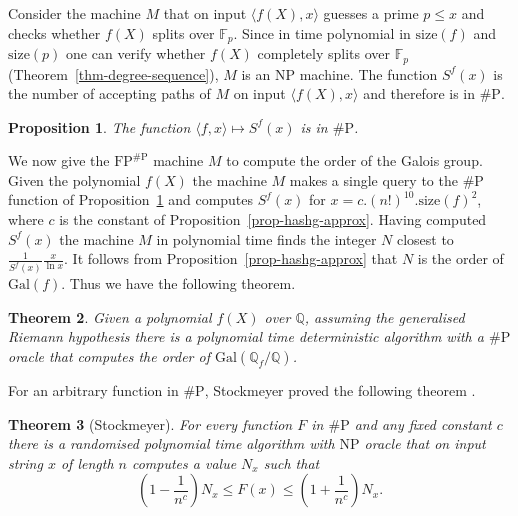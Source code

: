 \documentclass[11pt]{madras}%
\newtheorem{theorem}{Theorem}[chapter]
\newtheorem{proposition}[theorem]{Proposition}
\theoremstyle{remark}
\newcommand{\Gal}[1]{{\ensuremath{\mathrm{Gal}\left(#1\right)}}}
\newcommand{\size}[1]{{\ensuremath{\mathrm{size}\left(#1\right)}}}
\begin{document}

Consider the machine $M$ that on input $\langle f(X) , x \rangle$
guesses a prime $p \leq x$ and checks whether $f(X)$ splits over
$\mathbb{F}_p$. Since in time polynomial in $\size{f}$ and $\size{p}$
one can verify whether $f(X)$ completely splits over $\mathbb{F}_p$
(Theorem~\ref{thm-degree-sequence}), $M$ is an $\mathrm{NP}$ machine.
The function $S^f(x)$ is the number of accepting paths of $M$ on input
$\langle f(X),x\rangle$ and therefore is in $\# \mathrm{P}$.

\begin{proposition}\label{prop-numP}
  The function $\langle f , x \rangle \mapsto S^f(x)$ is in $\#
  \mathrm{P}$.
\end{proposition}

We now give the $\mathrm{FP}^{\# \mathrm{P}}$ machine $M$ to compute
the order of the Galois group. Given the polynomial $f(X)$ the machine
$M$ makes a single query to the $\# \mathrm{P}$ function of
Proposition~\ref{prop-numP} and computes $S^f(x)$ for $x = c.
(n!)^{10}. \size{f}^2$, where $c$ is the constant of
Proposition~\ref{prop-hashg-approx}.  Having computed $S^f(x)$ the
machine $M$ in polynomial time finds the integer $N$ closest to
$\frac{1}{S^f(x)}\frac{x}{\ln{x}}$. It follows from
Proposition~\ref{prop-hashg-approx} that $N$ is the order of
$\Gal{f}$.  Thus we have the following theorem.


\begin{theorem}\label{thm-order-finding}
  Given a polynomial $f(X)$ over $\mathbb{Q}$, assuming the
  generalised Riemann hypothesis there is a polynomial time
  deterministic algorithm with a $\# \mathrm{P}$ oracle that computes
  the order of $\Gal{\mathbb{Q}_f/\mathbb{Q}}$.
\end{theorem}

For an arbitrary function in $\# \mathrm{P}$, Stockmeyer proved the
following theorem \cite{stockmeyer85approximating}.

\begin{theorem}[Stockmeyer]\label{thm-stockmeyer}
  For every function $F$ in $\# \mathrm{P}$ and any fixed constant $c$
  there is a randomised polynomial time algorithm with $\mathrm{NP}$
  oracle that on input string $x$ of length $n$ computes a value $N_x$
  such that
  \[
  \left( 1 - \frac{1}{n^c}\right) N_x \leq F(x) \leq \left( 1 +
    \frac{1}{n^c}\right) N_x.
  \]
\end{theorem}
\end{document}
